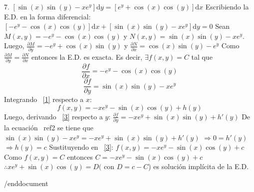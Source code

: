 \documentclass{article}
\begin{document}
      7. $ [\sin (x) \sin (y) - xe^y] \mathrm{d}y = [e^y + \cos (x) \cos (y)] \mathrm{d}x $
      Escribiendo la E.D. en la forma diferencial:
      $ [-e^y - \cos (x) \cos (y)] \mathrm{d}x + [\sin (x) \sin (y) - xe^y] \mathrm{d}y = 0 $
      Sean $ M(x,y) = -e^y - \cos (x) \cos (y) $ y $ N(x,y) = \sin (x) \sin (y) - xe^y $. Luego,
      $ \frac{\partial M}{\partial y} = -e^y + \cos (x) \sin (y) $ y
      $ \frac{\partial N}{\partial x} = \cos (x) \sin (y) -e^y $
      Como $ \frac{\partial M}{\partial y} = \frac{\partial N}{\partial x} $ entonces la E.D. es exacta. Es decir, $ \exists f(x,y) = C $ tal que
      \begin{equation}
            \label{1}
            \frac{\partial f}{\partial x} = -e^y - \cos (x) \cos (y)
      \end{equation}
      \begin{equation}
            \label{2}
            \frac{\partial f}{\partial y} = \sin (x) \sin (y) - xe^y
      \end{equation}
      Integrando ~\ref{1} respecto a $ x $:
      \begin{equation}
            \label{3}
            f(x,y) = -xe^y - \sin (x) \cos (y) + h(y)
      \end{equation}
      Luego, derivando ~\ref{3} respecto a $ y $:
      $ \frac{\partial f}{\partial y} = - xe^y + \sin (x) \sin (y) + h'(y) $
      De la ecuación ~ref{2} se tiene que
      $ \sin (x) \sin (y) - xe^y = - xe^y + \sin (x) \sin (y) + h'(y) $
      $ \Longrightarrow 0 = h'(y) $
      $ \Longrightarrow h(y) = c $
      Sustituyendo en ~\ref{3}:
      $ f(x,y) = -xe^y - \sin (x) \cos (y) + c $
      Como $ f(x,y) = C $ entonces
      $ C = -xe^y - \sin (x) \cos (y) + c $
      $ \therefore xe^y + \sin (x) \cos (y) = D ($ con $ D = c - C $) es solución implícita de la E.D.
      
      
      
/end{document}
\end{document}
